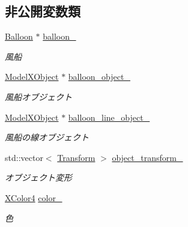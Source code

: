 \subsection*{非公開変数類}
\begin{DoxyCompactItemize}
\item 
\mbox{\hyperlink{class_balloon}{Balloon}} $\ast$ \mbox{\hyperlink{class_balloon_draw_a1d503c50dd419f2dd364c6e18f975585}{balloon\+\_\+}}
\begin{DoxyCompactList}\small\item\em 風船 \end{DoxyCompactList}\item 
\mbox{\hyperlink{class_model_x_object}{Model\+X\+Object}} $\ast$ \mbox{\hyperlink{class_balloon_draw_acc4ff1b604452841e91811edda3f3188}{balloon\+\_\+object\+\_\+}}
\begin{DoxyCompactList}\small\item\em 風船オブジェクト \end{DoxyCompactList}\item 
\mbox{\hyperlink{class_model_x_object}{Model\+X\+Object}} $\ast$ \mbox{\hyperlink{class_balloon_draw_a387388e5cad0a034cae82f038c1dd986}{balloon\+\_\+line\+\_\+object\+\_\+}}
\begin{DoxyCompactList}\small\item\em 風船の線オブジェクト \end{DoxyCompactList}\item 
std\+::vector$<$ \mbox{\hyperlink{class_transform}{Transform}} $>$ \mbox{\hyperlink{class_balloon_draw_a6135e9a9ecae17f428af4b3d8cc7d95e}{object\+\_\+transform\+\_\+}}
\begin{DoxyCompactList}\small\item\em オブジェクト変形 \end{DoxyCompactList}\item 
\mbox{\hyperlink{_vector3_d_8h_a680c30c4a07d86fe763c7e01169cd6cc}{X\+Color4}} \mbox{\hyperlink{class_balloon_draw_ac5fb39cbe0dd2dcdcb40c1edb142c43f}{color\+\_\+}}
\begin{DoxyCompactList}\small\item\em 色 \end{DoxyCompactList}\end{DoxyCompactItemize}
